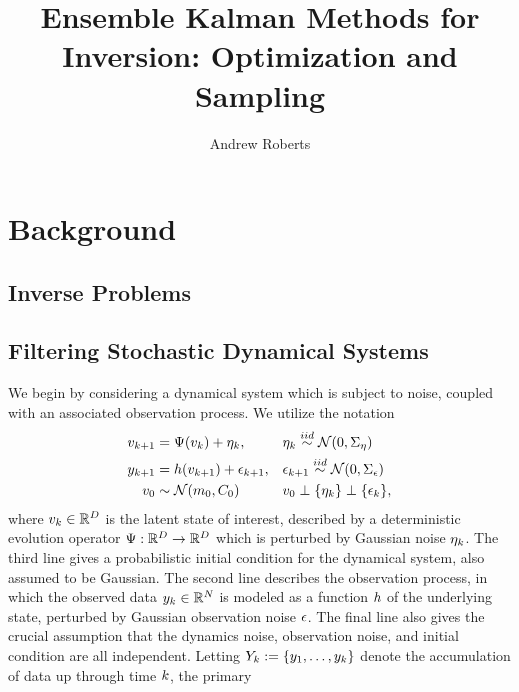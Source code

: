 \documentclass[12pt]{article}
\title{Ensemble Kalman Methods for Inversion: Optimization and Sampling}
\author{Andrew Roberts}
\begin{document}
\maketitle
\newpage

\section{Background}

\subsection{Inverse Problems}

\subsection{Filtering Stochastic Dynamical Systems}
We begin by considering a dynamical system which is subject to noise, coupled with an associated observation process. 
We utilize the notation 
\begin{align}
\dstate[\timeStep+1] &= \fwdOne(\dstate) + \indexTimeStep{\noiseDynamic}, 	  		 		 &&\indexTimeStep{\noiseDynamic} \overset{iid}{\sim} \Gaussian(0, \CovNoiseDynamic) \label{dynamic_model} \\
\ddataObs[\timeStep+1] &= \obsOp(\dstate[\timeStep+1]) + \indexTimeStep[\timeStep+1]{\noiseObs}, &&\indexTimeStep[\timeStep+1]{\noiseObs} \overset{iid}{\sim} \Gaussian(0, \CovNoiseObs) \nonumber \\
\dstate[0] &\sim \Gaussian(\stateMean[0], \stateCov[0]) && \nonumber \dstate[0] \perp \{\indexTimeStep{\noiseDynamic}\} \perp \{\indexTimeStep{\noiseObs}\}, \nonumber 
\end{align}
where $\dstate \in \R^{\dimState}$ is the latent state of interest, described by a deterministic evolution operator $\fwdOne: \R^{\dimState} \to \R^{\dimState}$ which is perturbed by 
Gaussian noise $\indexTimeStep{\noiseDynamic}$. The third line gives a probabilistic initial condition for the dynamical system, also assumed to be Gaussian. 
The second line describes the observation process, in which the observed data $\ddataObs \in \R^{\dimObs}$ is modeled as a
function $\obsOp$ of the underlying state, perturbed by Gaussian observation noise $\noiseObs$. The final line also gives the crucial assumption that the dynamics noise, observation 
noise, and initial condition are all independent. Letting $\dataObsCum := \{\ddataObs[1], \dots, \ddataObs\}$ denote the accumulation of data up through time $\timeStep$, the primary 
\end{document}
